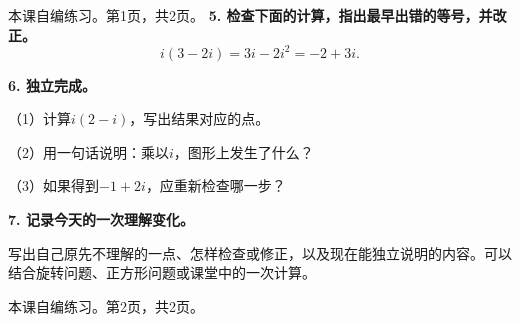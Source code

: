 \documentclass[UTF8,a4paper,11pt,fontset=fandol]{ctexart}
\begin{document}
\vfill{\small 本课自编练习。第1页，共2页。}
\newpage
\noindent\textbf{5. 检查下面的计算，指出最早出错的等号，并改正。}
\[i(3-2i)=3i-2i^2=-2+3i.\]
\par\vspace*{2.4cm}
\noindent\textbf{6. 独立完成。}
\par （1）计算$i(2-i)$，写出结果对应的点。
\par （2）用一句话说明：乘以$i$，图形上发生了什么？
\par （3）如果得到$-1+2i$，应重新检查哪一步？
\par\vspace*{2.4cm}
\noindent\textbf{7. 记录今天的一次理解变化。}
\par 写出自己原先不理解的一点、怎样检查或修正，以及现在能独立说明的内容。可以结合旋转问题、正方形问题或课堂中的一次计算。
\par\vspace*{2.4cm}
\vfill{\small 本课自编练习。第2页，共2页。}
\end{document}
